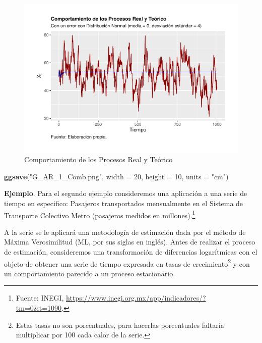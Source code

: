 \documentclass[
]{book}
\newenvironment{Shaded}{\begin{snugshade}}{\end{snugshade}}
\newcommand{\AttributeTok}[1]{\textcolor[rgb]{0.13,0.29,0.53}{#1}}
\newcommand{\DecValTok}[1]{\textcolor[rgb]{0.00,0.00,0.81}{#1}}
\newcommand{\FunctionTok}[1]{\textcolor[rgb]{0.13,0.29,0.53}{\textbf{#1}}}
\newcommand{\NormalTok}[1]{#1}
\newcommand{\StringTok}[1]{\textcolor[rgb]{0.31,0.60,0.02}{#1}}
\begin{document}
\begin{figure}

{\centering \includegraphics{Notas-Series-Tiempo_files/figure-latex/fig45-1} 

}

\caption{Comportamiento de los Procesos Real y Teórico}\label{fig:fig45}
\end{figure}

\begin{Shaded}
\begin{Highlighting}[]
\FunctionTok{ggsave}\NormalTok{(}\StringTok{"G\_AR\_1\_Comb.png"}\NormalTok{, }\AttributeTok{width =} \DecValTok{20}\NormalTok{, }\AttributeTok{height =} \DecValTok{10}\NormalTok{, }\AttributeTok{units =} \StringTok{"cm"}\NormalTok{)}
\end{Highlighting}
\end{Shaded}

\textbf{Ejemplo}. Para el segundo ejemplo consideremos una aplicación a una serie de tiempo en especifico: Pasajeros transportados mensualmente en el Sistema de Transporte Colectivo Metro (pasajeros medidos en millones).\footnote{Fuente: INEGI, \url{https://www.inegi.org.mx/app/indicadores/?tm=0&t=1090}.}

A la serie se le aplicará una metodología de estimación dada por el método de Máxima Verosimilitud (ML, por sus siglas en inglés). Antes de realizar el proceso de estimación, consideremos una transformación de diferencias logarítmicas con el objeto de obtener una serie de tiempo expresada en tasas de crecimiento\footnote{Estas tasas no son porcentuales, para hacerlas porcentuales faltaría multiplicar por 100 cada calor de la serie.} y con un comportamiento parecido a un proceso estacionario.
\end{document}
